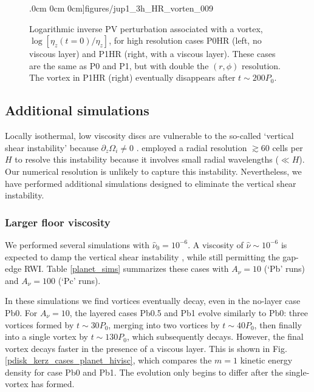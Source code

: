 \begin{figure}
    .0cm 0cm 0cm]{figures/jup1_3h_HR_vorten_009}
  \caption{Logarithmic inverse PV perturbation associated with a
    vortex, $\log{\left[\eta_z(t=0)/\eta_z\right]}$, for high resolution cases
    P0HR (left, no viscous layer) and P1HR (right, with a viscous
    layer). These cases are the same as P0 and P1, but with double the
    $(r,\phi)$ resolution. The vortex in P1HR (right) eventually disappears
     after $t \sim 200P_0$. 
    \label{HR_sims}}
\end{figure}

\subsection{Additional simulations}%
Locally isothermal, low viscosity discs are vulnerable to the
so-called `vertical shear 
instability' because $\partial_z\Omega_i\neq 0$ \citep{nelson12}. 
\citeauthor{nelson12} employed a radial  resolution $\gtrsim 60$ cells
per $H$ to resolve this instability because it involves small radial
wavelengths ($\ll H$). Our numerical resolution is unlikely to capture
this instability. Nevertheless, we have performed additional
simulations designed to eliminate the vertical shear instability.   

\subsubsection{Larger floor viscosity}
We performed several simulations with $\hat{\nu}_0=10^{-6}$. A viscosity of
$\hat{\nu}\sim 10^{-6}$ is expected to damp the vertical shear 
instability \citep{nelson12}, while still permitting the gap-edge
RWI. Table \ref{planet_sims} summarizes
these cases with $A_\nu=10$ (`Pb' runs) and $A_\nu=100$ (`Pc' runs). 

In these simulations we find vortices eventually decay, even in the
no-layer case Pb0. For $A_\nu=10$, the layered cases Pb0.5 and Pb1 evolve
similarly  to Pb0: three vortices formed by $t\sim30P_0$, merging into two
vortices by $t\sim40P_0$, then finally into a single vortex by
$t\sim130P_0$, which subsequently decays. However, the final vortex
decays faster in the presence of a viscous layer. This is shown in
Fig. \ref{pdisk_kerz_cases_planet_hivisc}, which compares the $m=1$
kinetic energy density for case Pb0 and Pb1. The evolution only begins
to differ after the single-vortex has formed. 

